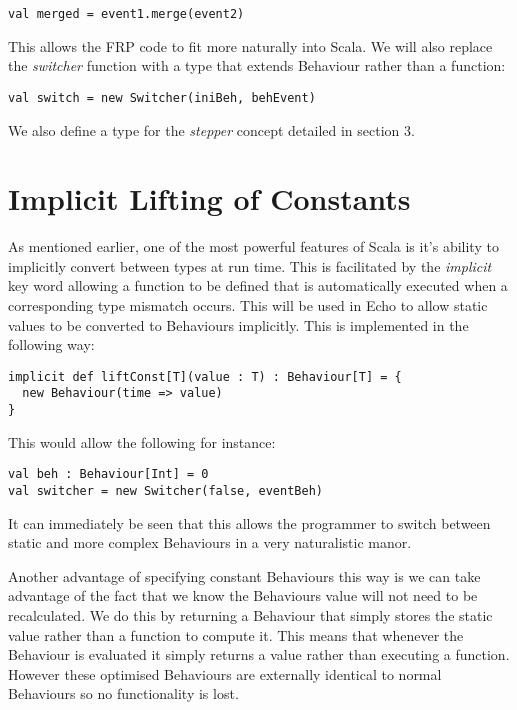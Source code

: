 \begin{verbatim}
val merged = event1.merge(event2)
\end{verbatim}

  This allows the FRP code to fit more naturally into Scala. We will also replace the \emph{switcher} function
  with a type that extends Behaviour rather than a function:
  
\begin{verbatim}
val switch = new Switcher(iniBeh, behEvent)
\end{verbatim}

  We also define a type for the \emph{stepper} concept detailed in section 3. 

  \section{Implicit Lifting of Constants}
    As mentioned earlier, one of the most powerful features of Scala is it's ability to implicitly convert between
    types at run time. This is facilitated by the \emph{implicit} key word allowing a function to be defined
    that is automatically executed when a corresponding type mismatch occurs. This will be used in Echo to allow 
    static values to be converted to Behaviours implicitly. This is implemented in the following way:  

\begin{verbatim}
implicit def liftConst[T](value : T) : Behaviour[T] = {
  new Behaviour(time => value)
}
\end{verbatim}              
    
    This would allow the following for instance:

\begin{verbatim}
val beh : Behaviour[Int] = 0
val switcher = new Switcher(false, eventBeh)
\end{verbatim}       

    It can immediately be seen that this allows the programmer to switch between static and more complex
    Behaviours in a very naturalistic manor.
    
    Another advantage of specifying constant Behaviours this way is we can take advantage of the fact that
    we know the Behaviours value will not need to be recalculated. We do this by returning a Behaviour
    that simply stores the static value rather than a function to compute it. This means that whenever the Behaviour
    is evaluated it simply returns a value rather than executing a function. However these optimised Behaviours
    are externally identical to normal Behaviours so no functionality is lost.
    
